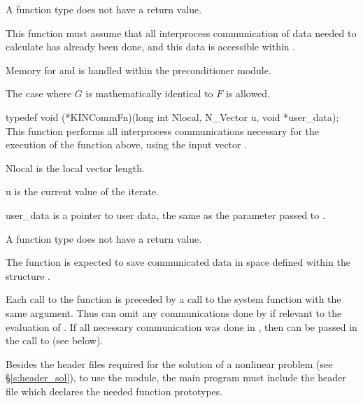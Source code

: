 {
  A  function type does not have a return value.
}
{
  This function must assume that all interprocess communication of data needed to 
  calculate  has already been done, and this data is accessible within
  .

   Memory for  and  is handled within the preconditioner module.

  The case where $G$ is mathematically identical to $F$ is allowed.
}
{
  typedef void (*KINCommFn)(long int Nlocal, N\_Vector u, void *user\_data);
}
{
  This  function performs all interprocess communications necessary 
  for the execution of the  function above, using the input vector .
}
{
  \begin{args}[Nlocal]
  \item[Nlocal] 
    is the local vector length.
  \item[u]
    is the current value of the iterate.
  \item[user\_data]
    is a pointer to user data, the same as the       
    parameter passed to .  
  \end{args}
}
{
  A  function type does not have a return value.
}
{
  The  function is expected to save communicated data in space defined
  within the structure . 

  Each call to the  function is preceded by a call to the system function
   with the same  argument.  Thus  can omit 
  any communications done by  if relevant to the evaluation of .
  If all necessary communication was done in , then 
  can be passed in the call to  (see below).
}

Besides the header files required for the solution of a nonlinear problem
(see \S\ref{s:header_sol}),  to use the {\kinbbdpre} module, the main program 
must include the header file  which declares the needed
function prototypes.

